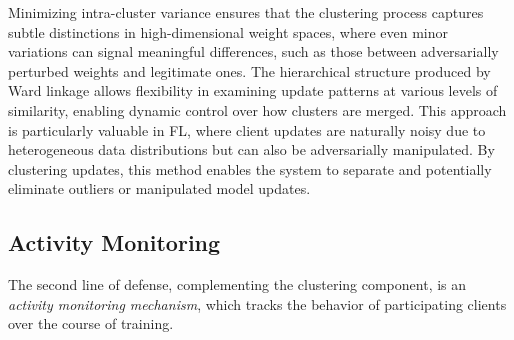 Minimizing intra-cluster variance ensures that the clustering process captures subtle distinctions in high-dimensional weight spaces, where even minor variations can signal meaningful differences, such as those between adversarially perturbed weights and legitimate ones. The hierarchical structure produced by Ward linkage allows flexibility in examining update patterns at various levels of similarity, enabling dynamic control over how clusters are merged. This approach is particularly valuable in FL, where client updates are naturally noisy due to heterogeneous data distributions but can also be adversarially manipulated. By clustering updates, this method enables the system to separate and potentially eliminate outliers or manipulated model updates.
\label{goal1}

\subsection{Activity Monitoring}
\label{subsec:activity_monitoring}

The second line of defense, complementing the clustering component, is an \textit{activity monitoring mechanism}, which tracks the behavior of participating clients over the course of training. 

